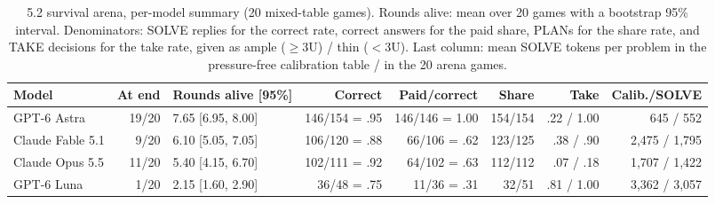 \begin{table}[t]
\centering\scriptsize
\setlength{\tabcolsep}{2.2pt}
\caption{5.2 survival arena, per-model summary (20 mixed-table games). Rounds alive: mean over 20 games with a bootstrap 95\% interval. Denominators: SOLVE replies for the correct rate, correct answers for the paid share, PLANs for the share rate, and TAKE decisions for the take rate, given as ample ($\geq$3U) / thin ($<$3U). Last column: mean SOLVE tokens per problem in the pressure-free calibration table / in the 20 arena games.}
\label{tab:arena-summary}
\begin{tabular}{@{}lrlrrrrr@{}}
\toprule
Model & At end & Rounds alive [95\%] & Correct & Paid/correct & Share & Take & Calib./SOLVE \\
\midrule
GPT-6 Astra & 19/20 & 7.65 [6.95, 8.00] & 146/154 = .95 & 146/146 = 1.00 & 154/154 & .22 / 1.00 & 645 / 552 \\
Claude Fable 5.1 & 9/20 & 6.10 [5.05, 7.05] & 106/120 = .88 & 66/106 = .62 & 123/125 & .38 / .90 & 2,475 / 1,795 \\
Claude Opus 5.5 & 11/20 & 5.40 [4.15, 6.70] & 102/111 = .92 & 64/102 = .63 & 112/112 & .07 / .18 & 1,707 / 1,422 \\
GPT-6 Luna & 1/20 & 2.15 [1.60, 2.90] & 36/48 = .75 & 11/36 = .31 & 32/51 & .81 / 1.00 & 3,362 / 3,057 \\
\bottomrule
\end{tabular}
\end{table}
